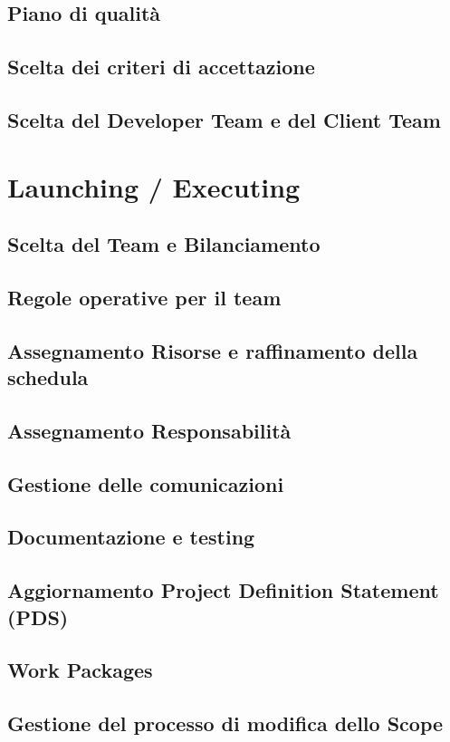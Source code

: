 \documentclass[12pt, a4paper]{article}
\begin{document}
\subsection{Piano di qualità}
\subsection{Scelta dei criteri di accettazione}
\subsection{Scelta del Developer Team e del Client Team}

\section{Launching / Executing}
\subsection{Scelta del Team e Bilanciamento}
\subsection{Regole operative per il team}
\subsection{Assegnamento Risorse e raffinamento della schedula}
\subsection{Assegnamento Responsabilità}
\subsection{Gestione delle comunicazioni}
\subsection{Documentazione e testing}
\subsection{Aggiornamento Project Definition Statement (PDS)}
\subsection{Work Packages}
\subsection{Gestione del processo di modifica dello Scope}
\end{document}
